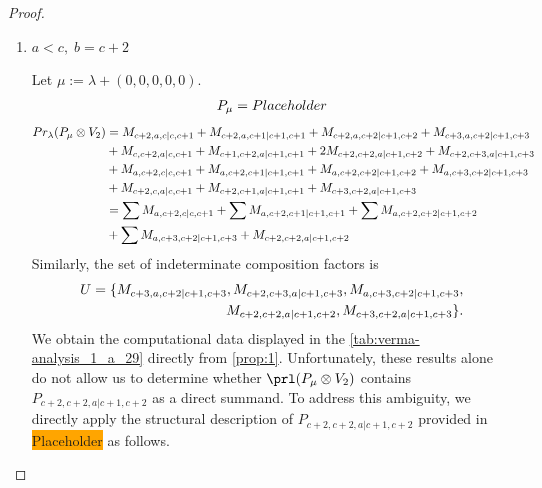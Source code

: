 \begin{proof}
\begin{enumerate}
\begin{enumerate}
\begin{enumerate}
          \item $ a < c,\; b = c+2 $\par
        Let $\mu:=\lambda + (0,0,0,0,0) $.
        \begin{equation}\notag
          \begin{aligned}
            P_\mu = Placeholder
          \end{aligned}
        \end{equation}
        \begin{equation}\notag
          \begin{aligned}
            Pr_{\lambda}(P_\mu \otimes V_{2}) &=
M_{c+2,a,c|c,c+1}
+ M_{c+2,a,c+1|c+1,c+1}
+ M_{c+2,a,c+2|c+1,c+2}
+ M_{c+3,a,c+2|c+1,c+3}\\
                                               &
+ M_{c,c+2,a|c,c+1}
+ M_{c+1,c+2,a|c+1,c+1}
+ 2M_{c+2,c+2,a|c+1,c+2}
+ M_{c+2,c+3,a|c+1,c+3}\\
                                               &
+ M_{a,c+2,c|c,c+1}
+ M_{a,c+2,c+1|c+1,c+1}
+ M_{a,c+2,c+2|c+1,c+2}
+ M_{a,c+3,c+2|c+1,c+3}\\
                                               &
+ M_{c+2,c,a|c,c+1}
+ M_{c+2,c+1,a|c+1,c+1}
+ M_{c+3,c+2,a|c+1,c+3} \\
                                               &=
\sum M_{a,c+2,c|c,c+1}
+ \sum M_{a,c+2,c+1|c+1,c+1}
+ \sum M_{a,c+2,c+2|c+1,c+2}\\
                                               &
+ \sum M_{a,c+3,c+2|c+1,c+3}
+  M_{c+2,c+2,a|c+1,c+2}
          \end{aligned}
        \end{equation}
      Similarly, the set of indeterminate composition factors is 
\begin{equation}\notag
  \begin{aligned}
    U = \{
M_{c+3,a,c+2|c+1,c+3},
M_{c+2,c+3,a|c+1,c+3},
M_{a,c+3,c+2|c+1,c+3},\\
M_{c+2,c+2,a|c+1,c+2},
M_{c+3,c+2,a|c+1,c+3}
\}. 
  \end{aligned}
\end{equation}
We obtain the computational data displayed in the \cref{tab:verma-analysis_1_a_29} directly from \newline \cref{prop:1}. Unfortunately, these results alone do not allow us to determine whether $\prl(P_\mu \otimes V_2)$ contains $P_{c+2,c+2,a|c+1,c+2}$ as a direct summand. To address this ambiguity, we directly apply the structural description of $P_{c+2,c+2,a|c+1,c+2}$ provided in \colorbox{orange}{Placeholder} as follows.

\end{enumerate}
\end{enumerate}
\end{enumerate}
\end{proof}
